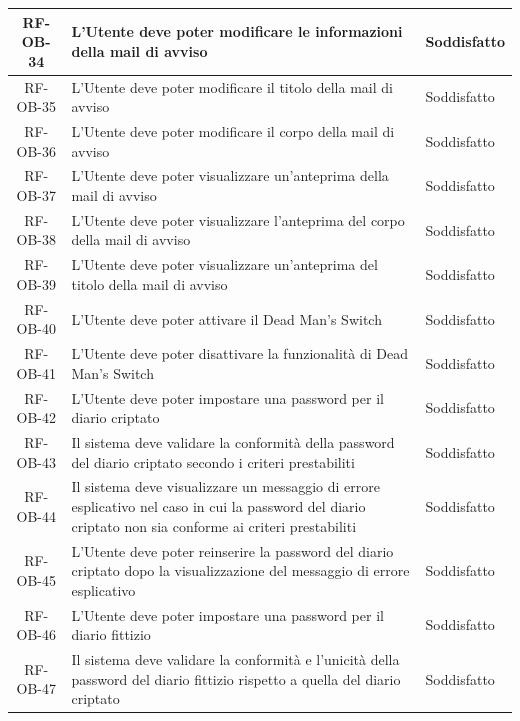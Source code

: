 \documentclass[a4paper,12pt]{article}
\begin{document}
\begin{center}
\begin{longtable}{|c|p{8.5cm}|>{\centering\arraybackslash}p{4cm}|}
RF-OB-34 & L'Utente deve poter modificare le informazioni della mail di avviso & Soddisfatto \\
\hline

RF-OB-35 & L'Utente deve poter modificare il titolo della mail di avviso & Soddisfatto \\
\hline

RF-OB-36 & L'Utente deve poter modificare il corpo della mail di avviso & Soddisfatto \\
\hline

RF-OB-37 & L'Utente deve poter visualizzare un'anteprima della mail di avviso & Soddisfatto \\
\hline

RF-OB-38 & L'Utente deve poter visualizzare l'anteprima del corpo della mail di avviso & Soddisfatto \\
\hline

RF-OB-39 & L'Utente deve poter visualizzare un'anteprima del titolo della mail di avviso & Soddisfatto \\
\hline

RF-OB-40 & L'Utente deve poter attivare il Dead Man's Switch & Soddisfatto \\
\hline

RF-OB-41 & L'Utente deve poter disattivare la funzionalità di Dead Man's Switch & Soddisfatto \\
\hline

RF-OB-42 & L'Utente deve poter impostare una password per il diario criptato & Soddisfatto \\
\hline

RF-OB-43 & Il sistema deve validare la conformità della password del diario criptato secondo i criteri prestabiliti & Soddisfatto \\
\hline

RF-OB-44 & Il sistema deve visualizzare un messaggio di errore esplicativo nel caso in cui la password del diario criptato non sia conforme ai criteri prestabiliti & Soddisfatto \\
\hline

RF-OB-45 & L'Utente deve poter reinserire la password del diario criptato dopo la visualizzazione del messaggio di errore esplicativo & Soddisfatto \\
\hline

RF-OB-46 & L'Utente deve poter impostare una password per il diario fittizio & Soddisfatto \\
\hline

RF-OB-47 & Il sistema deve validare la conformità e l'unicità della password del diario fittizio rispetto a quella del diario criptato & Soddisfatto \\
\hline


\end{longtable}
\end{center}
\end{document}
